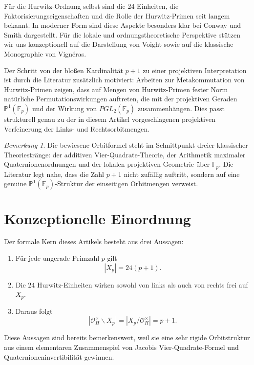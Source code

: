 \documentclass[12pt,a4paper]{article}
\theoremstyle{plain}
\theoremstyle{definition}
\theoremstyle{remark}
\newtheorem{bemerkung}[satz]{Bemerkung}
\newcommand{\OH}{\mathcal O_H}
\newcommand{\Fp}{\mathbb F_p}
\newcommand{\PP}{\mathbb P}
\begin{document}
	Für die Hurwitz-Ordnung selbst sind die 24 Einheiten, die Faktorisierungseigenschaften und die Rolle der Hurwitz-Primen seit langem bekannt. In moderner Form sind diese Aspekte besonders klar bei Conway und Smith dargestellt. Für die lokale und ordnungstheoretische Perspektive stützen wir uns konzeptionell auf die Darstellung von Voight sowie auf die klassische Monographie von Vignéras.
	
	Der Schritt von der bloßen Kardinalität \(p+1\) zu einer projektiven Interpretation ist durch die Literatur zusätzlich motiviert: Arbeiten zur Metakommutation von Hurwitz-Primen zeigen, dass auf Mengen von Hurwitz-Primen fester Norm natürliche Permutationswirkungen auftreten, die mit der projektiven Geraden \(\PP^1(\Fp)\) und der Wirkung von \(PGL_2(\Fp)\) zusammenhängen. Dies passt strukturell genau zu der in diesem Artikel vorgeschlagenen projektiven Verfeinerung der Links- und Rechtsorbitmengen.
	
	\begin{bemerkung}
		Die bewiesene Orbitformel steht im Schnittpunkt dreier klassischer Theoriestränge: der additiven Vier-Quadrate-Theorie, der Arithmetik maximaler Quaternionenordnungen und der lokalen projektiven Geometrie über \(\Fp\). Die Literatur legt nahe, dass die Zahl \(p+1\) nicht zufällig auftritt, sondern auf eine genuine \(\PP^1(\Fp)\)-Struktur der einseitigen Orbitmengen verweist.
	\end{bemerkung}
	
	\section{Konzeptionelle Einordnung}
	
	Der formale Kern dieses Artikels besteht aus drei Aussagen:
	
	\begin{enumerate}
		\item Für jede ungerade Primzahl \(p\) gilt
		\[
		|X_p|=24(p+1).
		\]
		
		\item Die \(24\) Hurwitz-Einheiten wirken sowohl von links als auch von rechts frei auf \(X_p\).
		
		\item Daraus folgt
		\[
		|\OH^\times\backslash X_p|
		=
		|X_p/\OH^\times|
		=
		p+1.
		\]
	\end{enumerate}
	
	Diese Aussagen sind bereits bemerkenswert, weil sie eine sehr rigide Orbitstruktur aus einem elementaren Zusammenspiel von Jacobis Vier-Quadrate-Formel und Quaternioneninvertibilität gewinnen.
	
\end{document}
